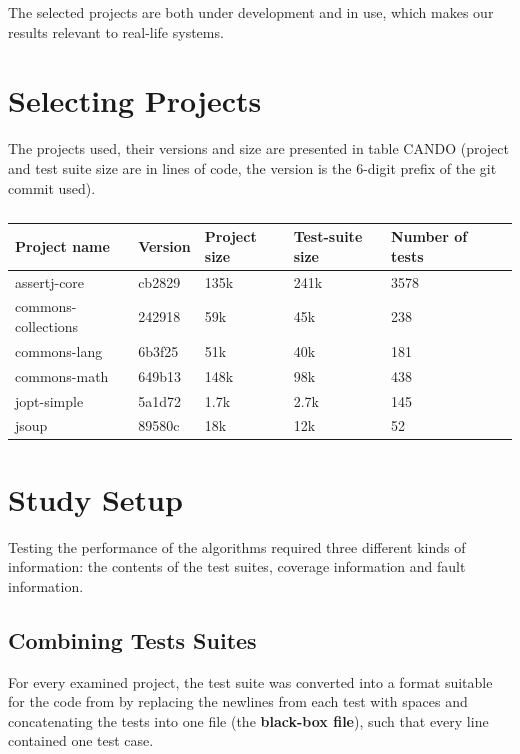 The selected projects are both under development and in use, which makes
our results relevant to real-life systems.

\section{Selecting Projects}

The projects used, their versions and size are presented in table CANDO
(project and test suite size are in lines of code, the version is the
6-digit prefix of the git commit used).

\begin{table}[htpb]
	\caption[]{}\label{tab:projects} %
	\centering
	\begin{tabular}{l l l l l l}
		\toprule
		Project name & Version & Project size & Test-suite size & Number of tests \\
		\midrule
		assertj-core & cb2829 & 135k & 241k &3578 \\
		commons-collections & 242918 & 59k & 45k & 238 \\
		commons-lang & 6b3f25 & 51k & 40k & 181 \\
		commons-math & 649b13 & 148k & 98k & 438 \\
		jopt-simple & 5a1d72 & 1.7k & 2.7k & 145 \\
		jsoup & 89580c & 18k & 12k & 52 \\
		\bottomrule
	\end{tabular}
\end{table}


\section{Study Setup}

Testing the performance of the algorithms required three different kinds
of information: the contents of the test suites, coverage information
and fault information.

\subsection{Combining Tests Suites}

For every examined project, the test suite was converted into a format
suitable for the code from \cite{cruciani2019scalable} by replacing the
newlines from each test with spaces and concatenating the tests into
one file (the \textbf{black-box file}), such that every line contained
one test case.

